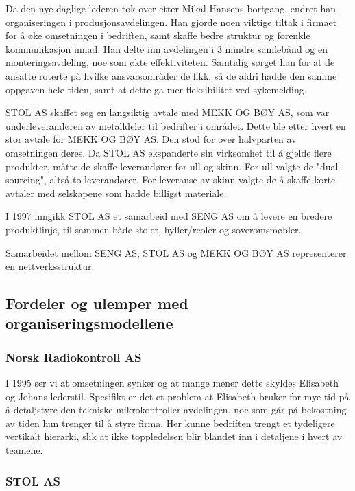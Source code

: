 Da den nye daglige lederen tok over etter Mikal Hansens bortgang, endret han organiseringen i produsjonsavdelingen.
Han gjorde noen viktige tiltak i firmaet for å øke omsetningen i bedriften, samt skaffe bedre struktur og forenkle kommunikasjon innad.
Han delte inn avdelingen i 3 mindre samlebånd og en monteringsavdeling, noe som økte effektiviteten. Samtidig sørget han for at de ansatte roterte på hvilke ansvarsområder de fikk, så de aldri hadde den samme oppgaven hele tiden, samt at dette ga mer fleksibilitet ved sykemelding.

STOL AS skaffet seg en langsiktig avtale med MEKK OG BØY AS, som var underleverandøren av metalldeler til bedrifter i området. Dette ble etter hvert en stor avtale for MEKK OG BØY AS. Den stod for over halvparten av omsetningen deres. Da STOL AS ekspanderte sin virksomhet til å gjelde flere produkter, måtte de skaffe leverandører for ull og skinn. For ull valgte de "dual-sourcing", altså to leverandører. For leveranse av skinn valgte de å skaffe korte avtaler med selskapene som hadde billigst materiale.

I 1997 inngikk STOL AS et samarbeid med SENG AS om å levere en bredere produktlinje, til sammen både stoler, hyller/reoler og soveromsmøbler.

Samarbeidet mellom SENG AS, STOL AS og MEKK OG BØY AS representerer en nettverksstruktur.

\subsection{Fordeler og ulemper med organiseringsmodellene}

\subsubsection{Norsk Radiokontroll AS}

I 1995 ser vi at omsetningen synker og at mange mener dette skyldes Elisabeth og Johans lederstil. Spesifikt er det et problem at Elisabeth bruker for mye tid på å detaljstyre den tekniske mikrokontroller-avdelingen, noe som går på bekostning av tiden hun trenger til å styre firma.
Her kunne bedriften trengt et tydeligere vertikalt hierarki, slik at ikke toppledelsen blir blandet inn i detaljene i hvert av teamene.

\subsubsection{STOL AS}

